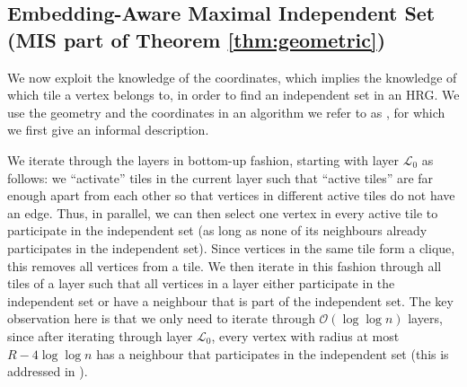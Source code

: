 \documentclass[letterpaper,11pt]{article}
\newcommand{\1}{\mathbb I}
\newcommand{\bigO}{\mathcal{O}}
\newcommand{\Layer}[1]{\mathcal{L}_{#1}}
\begin{document}
\subsection{Embedding-Aware Maximal Independent Set (MIS part of Theorem \ref{thm:geometric})}\label{sec:mis_geom}
We now exploit the knowledge of the coordinates, which implies the knowledge of which tile a vertex belongs to, in order to find an independent set in an HRG.
We use the geometry and the coordinates in an algorithm we refer to as \algomis, for which we first give an informal description. 

We iterate through the layers in bottom-up fashion, starting with layer $\Layer{0}$ as follows: we ``activate'' tiles in the current layer such that ``active tiles'' are far enough apart from each other so that vertices in different active tiles do not have an edge. Thus, in parallel, we can then select one vertex in every active tile to participate in the independent set (as long as none of its neighbours already participates in the independent set). Since vertices in the same tile form a clique, this removes all vertices from a tile. We then iterate in this fashion through all tiles of a layer such that all vertices in a layer either participate in the independent set or have a neighbour that is part of the independent set. The key observation here is that we only need to iterate through $\bigO(\log\log n)$ layers, since after iterating through layer $\Layer{0}$, every vertex with radius at most $R - 4\log\log n$ has a neighbour that participates in the independent set (this is addressed in ).   
\end{document}

